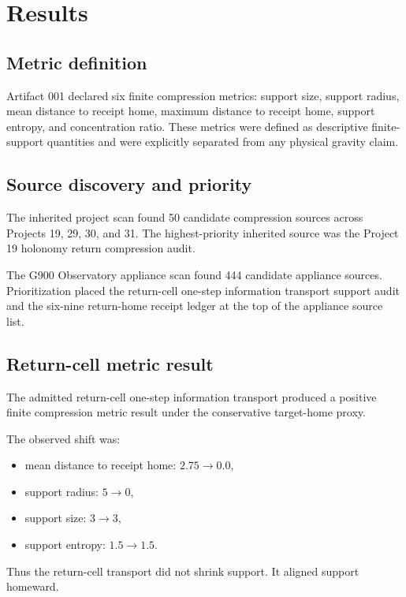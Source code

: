 \section{Results}

\subsection{Metric definition}

Artifact 001 declared six finite compression metrics: support size, support
radius, mean distance to receipt home, maximum distance to receipt home,
support entropy, and concentration ratio. These metrics were defined as
descriptive finite-support quantities and were explicitly separated from any
physical gravity claim.

\subsection{Source discovery and priority}

The inherited project scan found 50 candidate compression sources across
Projects 19, 29, 30, and 31. The highest-priority inherited source was the
Project 19 holonomy return compression audit.

The G900 Observatory appliance scan found 444 candidate appliance sources.
Prioritization placed the return-cell one-step information transport support
audit and the six-nine return-home receipt ledger at the top of the appliance
source list.

\subsection{Return-cell metric result}

The admitted return-cell one-step information transport produced a positive
finite compression metric result under the conservative target-home proxy.

The observed shift was:

\begin{itemize}
  \item mean distance to receipt home: $2.75 \rightarrow 0.0$,
  \item support radius: $5 \rightarrow 0$,
  \item support size: $3 \rightarrow 3$,
  \item support entropy: $1.5 \rightarrow 1.5$.
\end{itemize}

Thus the return-cell transport did not shrink support. It aligned support
homeward.


